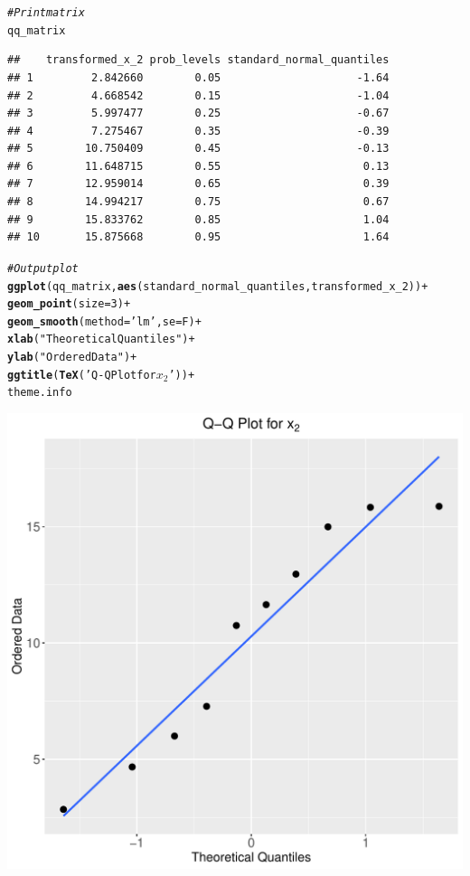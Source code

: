 \documentclass[12pt]{article}\usepackage[]{graphicx}\usepackage[]{color}
\makeatletter
\def\maxwidth{ %
  \ifdim\Gin@nat@width>\linewidth
    \linewidth
  \else
    \Gin@nat@width
  \fi
}
\newcommand{\hlnum}[1]{\textcolor[rgb]{0.686,0.059,0.569}{#1}}%
\newcommand{\hlstr}[1]{\textcolor[rgb]{0.192,0.494,0.8}{#1}}%
\newcommand{\hlcom}[1]{\textcolor[rgb]{0.678,0.584,0.686}{\textit{#1}}}%
\newcommand{\hlopt}[1]{\textcolor[rgb]{0,0,0}{#1}}%
\newcommand{\hlstd}[1]{\textcolor[rgb]{0.345,0.345,0.345}{#1}}%
\newcommand{\hlkwc}[1]{\textcolor[rgb]{0.333,0.667,0.333}{#1}}%
\newcommand{\hlkwd}[1]{\textcolor[rgb]{0.737,0.353,0.396}{\textbf{#1}}}%
\newenvironment{kframe}{%
 \def\at@end@of@kframe{}%
 \ifinner\ifhmode%
  \def\at@end@of@kframe{\end{minipage}}%
  \begin{minipage}{\columnwidth}%
 \fi\fi%
 \def\FrameCommand##1{\hskip\@totalleftmargin \hskip-\fboxsep
 \colorbox{shadecolor}{##1}\hskip-\fboxsep
     \hskip-\linewidth \hskip-\@totalleftmargin \hskip\columnwidth}%
 \MakeFramed {\advance\hsize-\width
   \@totalleftmargin\z@ \linewidth\hsize
   \@setminipage}}%
 {\par\unskip\endMakeFramed%
 \at@end@of@kframe}
\newenvironment{knitrout}{}{} %
\makeatother
\begin{document}
\begin{enumerate}[a)]
\begin{knitrout}
\begin{kframe}
\begin{alltt}
\hlcom{#Print matrix}
\hlstd{qq_matrix}
\end{alltt}
\begin{verbatim}
##    transformed_x_2 prob_levels standard_normal_quantiles
## 1         2.842660        0.05                     -1.64
## 2         4.668542        0.15                     -1.04
## 3         5.997477        0.25                     -0.67
## 4         7.275467        0.35                     -0.39
## 5        10.750409        0.45                     -0.13
## 6        11.648715        0.55                      0.13
## 7        12.959014        0.65                      0.39
## 8        14.994217        0.75                      0.67
## 9        15.833762        0.85                      1.04
## 10       15.875668        0.95                      1.64
\end{verbatim}
\begin{alltt}
\hlcom{#Output plot}
\hlkwd{ggplot}\hlstd{(qq_matrix,} \hlkwd{aes}\hlstd{(standard_normal_quantiles, transformed_x_2))} \hlopt{+}
  \hlkwd{geom_point}\hlstd{(}\hlkwc{size}\hlstd{=}\hlnum{3}\hlstd{)} \hlopt{+}
  \hlkwd{geom_smooth}\hlstd{(}\hlkwc{method}\hlstd{=}\hlstr{'lm'}\hlstd{,} \hlkwc{se}\hlstd{=F)} \hlopt{+}
  \hlkwd{xlab}\hlstd{(}\hlstr{"Theoretical Quantiles"}\hlstd{)} \hlopt{+}
  \hlkwd{ylab}\hlstd{(}\hlstr{"Ordered Data"}\hlstd{)} \hlopt{+}
  \hlkwd{ggtitle}\hlstd{(}\hlkwd{TeX}\hlstd{(}\hlstr{'Q-Q Plot for $x_2$'}\hlstd{))} \hlopt{+}
  \hlstd{theme.info}
\end{alltt}
\end{kframe}
\includegraphics[width=\maxwidth]{figure/unnamed-chunk-13-1} 


\end{knitrout}
\end{enumerate}
\end{document}

